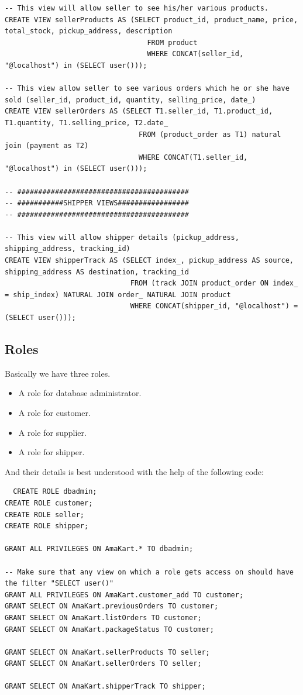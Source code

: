 \documentclass[a4paper,12pt]{article}
\begin{document}
\begin{verbatim}
-- This view will allow seller to see his/her various products.
CREATE VIEW sellerProducts AS (SELECT product_id, product_name, price, total_stock, pickup_address, description 
                                  FROM product
                                  WHERE CONCAT(seller_id, "@localhost") in (SELECT user()));

-- This view allow seller to see various orders which he or she have sold (seller_id, product_id, quantity, selling_price, date_) 
CREATE VIEW sellerOrders AS (SELECT T1.seller_id, T1.product_id, T1.quantity, T1.selling_price, T2.date_
                                FROM (product_order as T1) natural join (payment as T2)
                                WHERE CONCAT(T1.seller_id, "@localhost") in (SELECT user()));

-- #########################################
-- ###########SHIPPER VIEWS#################
-- #########################################

-- This view will allow shipper details (pickup_address, shipping_address, tracking_id)
CREATE VIEW shipperTrack AS (SELECT index_, pickup_address AS source, shipping_address AS destination, tracking_id
                              FROM (track JOIN product_order ON index_ = ship_index) NATURAL JOIN order_ NATURAL JOIN product 
                              WHERE CONCAT(shipper_id, "@localhost") = (SELECT user()));
\end{verbatim}

\subsection{Roles}
Basically we have three roles.

\begin{itemize}
    \item A role for database administrator.
    \item A role for customer.
    \item A role for supplier.
    \item A role for shipper.
\end{itemize}

And their details is best understood with the help of the following code:
\begin{verbatim}
  CREATE ROLE dbadmin;
CREATE ROLE customer;
CREATE ROLE seller;
CREATE ROLE shipper;

GRANT ALL PRIVILEGES ON AmaKart.* TO dbadmin;

-- Make sure that any view on which a role gets access on should have the filter "SELECT user()"
GRANT ALL PRIVILEGES ON AmaKart.customer_add TO customer;
GRANT SELECT ON AmaKart.previousOrders TO customer;
GRANT SELECT ON AmaKart.listOrders TO customer;
GRANT SELECT ON AmaKart.packageStatus TO customer;

GRANT SELECT ON AmaKart.sellerProducts TO seller;
GRANT SELECT ON AmaKart.sellerOrders TO seller;

GRANT SELECT ON AmaKart.shipperTrack TO shipper;
\end{verbatim}
\end{document}
